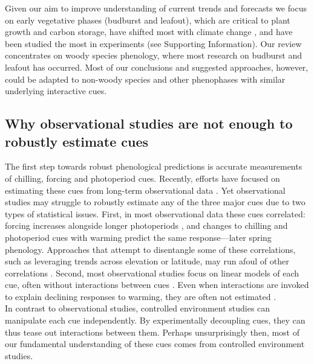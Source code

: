 \documentclass[11pt,letter]{article}
\begin{document}
Given our aim to improve understanding of current trends and forecasts we focus on early vegetative phases (budburst and leafout), which are critical to plant growth and carbon storage, have shifted most with climate change \citep{Cleland:2007or,IPCC:2014sm}, and have been studied the most in experiments (see Supporting Information). Our review concentrates on woody species phenology, where most research on budburst and leafout has occurred. Most of our conclusions and suggested approaches, however, could be adapted to non-woody species and other phenophases with similar underlying interactive cues. 

\subsection{Why observational studies are not enough to robustly estimate cues}
The first step towards robust phenological predictions is accurate measurements of chilling, forcing and photoperiod cues. Recently, efforts have focused on estimating these cues from long-term observational data \citep{Luedeling2009,lued2013diff}. Yet observational studies may struggle to robustly estimate any of the three major cues due to two types of statistical issues. First, in most observational data these cues correlated: forcing increases alongside longer photoperiods \citep{sarahailene2020}, and changes to chilling and photoperiod cues with warming predict the same response---later spring phenology. Approaches that attempt to disentangle some of these correlations, such as leveraging trends across elevation or latitude, may run afoul of other correlations \citep[][]{tansey2017}. Second, most observational studies focus on linear models of each cue, often without interactions between cues \citep{visser2001,polgar2014}. Even when interactions are invoked to explain declining responses to warming, they are often not estimated \citep[e.g.,][]{fu2015,asse2018}.\\

In contrast to observational studies, controlled environment studies can manipulate each cue independently. By experimentally decoupling cues, they can thus tease out interactions between them. Perhaps unsurprisingly then, most of our fundamental understanding of these cues comes from controlled environment studies.\\
\end{document}
